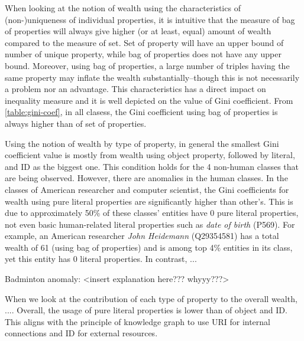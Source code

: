 When looking at the notion of wealth using the characteristics of (non-)uniqueness of individual properties, it is intuitive that the measure of bag of properties will always give higher (or at least, equal) amount of wealth compared to the measure of set. Set of property will have an upper bound of number of unique property, while bag of properties does not have any upper bound. Moreover, using bag of properties, a large number of triples having the same property may inflate the wealth substantially--though this is not necessarily a problem nor an advantage. This characteristics has a direct impact on inequality measure and it is well depicted on the value of Gini coefficient. From \autoref{table:gini-coef}, in all clasess, the Gini coefficient using bag of properties is always higher than of set of properties.

Using the notion of wealth by type of property, in general the smallest Gini coefficient value is mostly from wealth using object property, followed by literal, and ID as the biggest one. This condition holds for the 4 non-human classes that are being observed. However, there are anomalies in the human classes. In the classes of American researcher and computer scientist, the Gini coefficients for wealth using pure literal properties are significantly higher than other's. This is due to approximately 50\% of these classes' entities have 0 pure literal properties, not even basic human-related literal properties such as \textit{date of birth} (P569). For example, an American researcher \textit{John Heidemann} (Q29354581) has a total wealth of 61 (using bag of properties) and is among top 4\% entities in its class, yet this entity has 0 literal properties. In contrast, ...

Badminton anomaly: <insert explanation here??? whyyy???>

When we look at the contribution of each type of property to the overall wealth, ....
Overall, the usage of pure literal properties is lower than of object and ID. This aligns with the principle of knowledge graph to use URI for internal connections and ID for external resources.

